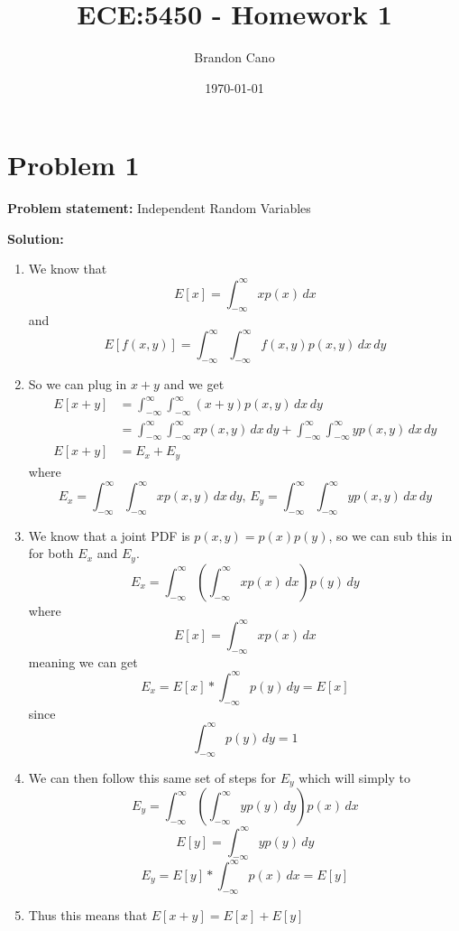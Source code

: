 \documentclass[12pt]{article}
\title{ECE:5450 - Homework 1}
\author{Brandon Cano}
\date{\today}
\begin{document}
\maketitle

\section*{Problem 1}
\textbf{Problem statement:} Independent Random Variables

\bigskip

\textbf{Solution:}

\begin{enumerate}
    \item We know that
    \[
    E[x] = \int_{-\infty}^{\infty}xp(x)\,dx
    \]
    and
    \[
    E[f(x, y)] = \int_{-\infty}^{\infty}\int_{-\infty}^{\infty}f(x, y)p(x, y)\,dx\,dy
    \]
    \item So we can plug in $x + y$ and we get
    \begin{align*}
	E[x + y] &= \int_{-\infty}^{\infty}\int_{-\infty}^{\infty}(x + y)p(x, y)\,dx\,dy \\
	&= \int_{-\infty}^{\infty}\int_{-\infty}^{\infty}xp(x, y)\,dx\,dy + \int_{-\infty}^{\infty}\int_{-\infty}^{\infty}yp(x, y)\,dx\,dy \\
	E[x + y] &= E_{x} + E_{y} 
	\end{align*}
	where
	\[
	E_{x} = \int_{-\infty}^{\infty}\int_{-\infty}^{\infty}xp(x, y)\,dx\,dy,\,
	E_{y} = \int_{-\infty}^{\infty}\int_{-\infty}^{\infty}yp(x, y)\,dx\,dy
	\]
    \item We know that a joint PDF is $p(x, y) = p(x)p(y)$, so we can sub this in for both $E_{x}$ and $E_{y}$.
    \[
    E_{x} = \int_{-\infty}^{\infty}\left(\int_{-\infty}^{\infty}xp(x)\,dx\right)p(y)\,dy
    \]
    where
    \[
    E[x] = \int_{-\infty}^{\infty}xp(x)\,dx
    \]
    meaning we can get
    \[
    E_{x} = E[x] * \int_{-\infty}^{\infty}p(y)\,dy = E[x]
    \]
    since 
    \[
    \int_{-\infty}^{\infty}p(y)\,dy = 1
    \]
    \item We can then follow this same set of steps for $E_{y}$ which will simply to
    \[
    E_{y} = \int_{-\infty}^{\infty}\left(\int_{-\infty}^{\infty}yp(y)\,dy\right)p(x)\,dx
    \]
    \[
    E[y] = \int_{-\infty}^{\infty}yp(y)\,dy
    \]
    \[
    E_{y} = E[y] * \int_{-\infty}^{\infty}p(x)\,dx = E[y]
    \]
    \item Thus this means that $E[x + y] = E[x] + E[y]$
\end{enumerate}
\end{document}
